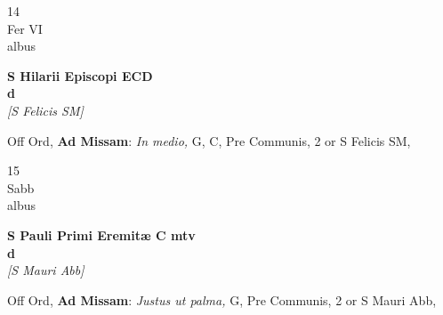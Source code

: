 \documentclass[10pt, openany]{book}
\begin{document}
        \begin{center}
            \begin{minipage}{3.5in}
                \vspace{2em}
                \begin{minipage}{0.5in}
                    {\Huge 14} \\
                    {\normalsize Fer VI} \\
                    {\normalsize albus}
                \end{minipage}
                \begin{minipage}{3.0in}
                    \textbf{ \large S Hilarii Episcopi ECD \\
                    \textnormal{\normalsize d}} \\ \textit{[S Felicis SM]} \\ 
                \end{minipage}
                \begin{justify}Off Ord, \textbf{Ad Missam}: \textit{In medio,} G, C, Pre Communis, 2 or S Felicis SM,   
                \end{justify}
            \end{minipage}
        \end{center}
    
        \begin{center}
            \begin{minipage}{3.5in}
                \vspace{2em}
                \begin{minipage}{0.5in}
                    {\Huge 15} \\
                    {\normalsize Sabb} \\
                    {\normalsize albus}
                \end{minipage}
                \begin{minipage}{3.0in}
                    \textbf{ \large S Pauli Primi Eremitæ C mtv \\
                    \textnormal{\normalsize d}} \\ \textit{[S Mauri Abb]} \\ 
                \end{minipage}
                \begin{justify}Off Ord, \textbf{Ad Missam}: \textit{Justus ut palma,} G, Pre Communis, 2 or S Mauri Abb,   
                \end{justify}
            \end{minipage}
        \end{center}
    
\end{document}
